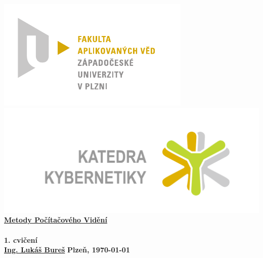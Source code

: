 \documentclass[12pt, a4paper]{article}
\newcommand{\cisloCviceni}{1. cvičení}
\begin{document}
 









 
\begin{titlepage}
\begin{center}
	\includegraphics[trim = 0.6cm 0.5cm 0.9cm 0.5cm, scale=1]{FAV_logo_cz.pdf}
	\hspace*{\fill}
	\includegraphics[trim = 3.5cm 1.5cm 2.6cm 2cm, scale=0.295]{./KKY_logo_cz.pdf}\\
	\vspace*{\fill}
	\textbf{\Huge{\href{http://www.kky.zcu.cz/cs/courses/mpv}{Metody Počítačového Vidění} \\ ~ \\ \cisloCviceni}}\\
	\vspace*{\fill}
	\textbf{\large{\href{mailto:LBures@kky.zcu.cz}{Ing. Lukáš Bureš}}} \hfill \textbf{\large{Plzeň, \today}}
\end{center}
\end{titlepage}












\end{document}
